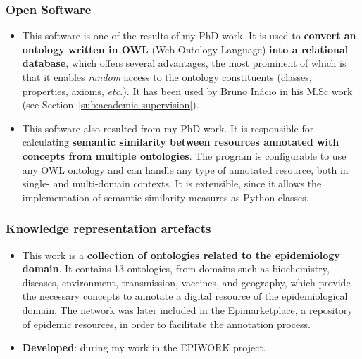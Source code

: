 \subsubsection{Open Software}

\begin{itemize}
    \item This software is one of the results of my PhD work. It is used to \textbf{convert an ontology written in OWL} (Web Ontology Language) \textbf{into a relational database}, which offers several advantages, the most prominent of which is that it enables \emph{random} access to the ontology constituents (classes, properties, axioms, \emph{etc.}). It has been used by Bruno Inácio in his M.Sc work (see Section~\ref{sub:academic-supervision}).
\end{itemize}


\begin{itemize}
    \item This software also resulted from my PhD work. It is responsible for calculating \textbf{semantic similarity between resources annotated with concepts from multiple ontologies}. The program is configurable to use any OWL ontology and can handle any type of annotated resource, both in single- and multi-domain contexts. It is extensible, since it allows the implementation of semantic similarity measures as Python classes.
\end{itemize}


\subsubsection{Knowledge representation artefacts}

\begin{itemize}
    \item This work is a \textbf{collection of ontologies related to the epidemiology domain}. It contains 13 ontologies, from domains such as biochemistry, diseases, environment, transmission, vaccines, and geography, which provide the necessary concepts to annotate a digital resource of the epidemiological domain. The network was later included in the Epimarketplace, a repository of epidemic resources, in order to facilitate the annotation process.
    \item \textbf{Developed}: during my work in the EPIWORK project.
\end{itemize}

